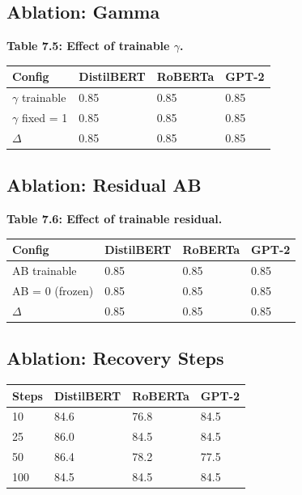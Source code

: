\subsection{Ablation: Gamma}

\textbf{Table 7.5: Effect of trainable $\gamma$.}

\begin{table}[H]
\centering
\small
\begin{tabular}{llll}
\toprule
\textbf{Config} & \textbf{DistilBERT} & \textbf{RoBERTa} & \textbf{GPT-2} \\
\midrule
$\gamma$ trainable & 0.85 & 0.85 & 0.85 \\
$\gamma$ fixed = 1 & 0.85 & 0.85 & 0.85 \\
$\Delta$ & 0.85 & 0.85 & 0.85 \\
\bottomrule
\end{tabular}
\end{table}

\subsection{Ablation: Residual AB}

\textbf{Table 7.6: Effect of trainable residual.}

\begin{table}[H]
\centering
\small
\begin{tabular}{llll}
\toprule
\textbf{Config} & \textbf{DistilBERT} & \textbf{RoBERTa} & \textbf{GPT-2} \\
\midrule
AB trainable & 0.85 & 0.85 & 0.85 \\
AB = 0 (frozen) & 0.85 & 0.85 & 0.85 \\
$\Delta$ & 0.85 & 0.85 & 0.85 \\
\bottomrule
\end{tabular}
\end{table}

\subsection{Ablation: Recovery Steps}

\begin{table}[H]
\centering
\small
\begin{tabular}{llll}
\toprule
\textbf{Steps} & \textbf{DistilBERT} & \textbf{RoBERTa} & \textbf{GPT-2} \\
\midrule
10 & 84.6 & 76.8 & 84.5 \\
25 & 86.0 & 84.5 & 84.5 \\
50 & 86.4 & 78.2 & 77.5 \\
100 & 84.5 & 84.5 & 84.5 \\
\bottomrule
\end{tabular}
\end{table}

